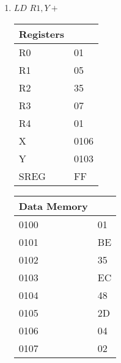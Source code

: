\documentclass[12pt,letterpaper]{article}
\begin{document}
\begin{enumerate}
\begin{enumerate}[i]
    \item $LD$  $R1,Y+$\\
        \begin{tabular}{l l}
            Registers & \\
            \hline
            R0   & 01 \\
            R1   & 05 \\
            R2   & 35 \\
            R3   & 07 \\
            R4   & 01 \\
            X    & 0106 \\
            Y    & 0103 \\
            SREG & FF \\
        \end{tabular}
        \begin{tabular}{l l}
            Data Memory & \\
            \hline
            0100 & 01 \\
            0101 & BE \\
            0102 & 35 \\
            0103 & EC \\
            0104 & 48 \\
            0105 & 2D \\
            0106 & 04 \\
            0107 & 02 \\
        \end{tabular}


\end{enumerate}
\end{enumerate}
\end{document}
